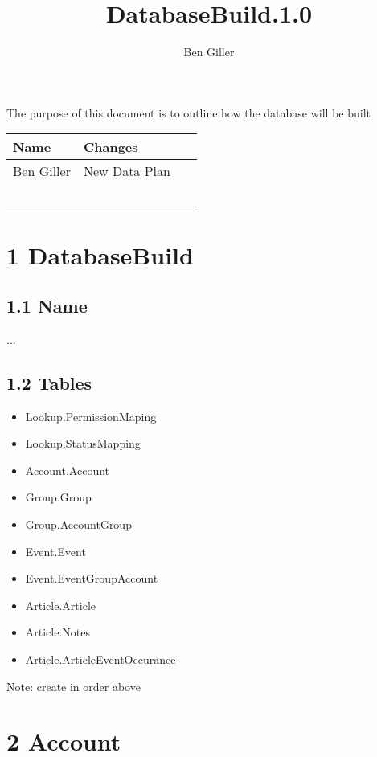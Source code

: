 \documentclass[12pt,fleqn]{article}
\title{DatabaseBuild.1.0}
\author{Ben Giller}
\begin{document}
\maketitle

The purpose of this document is to outline how the database will be built

\begin{table}
\centering
\label{DB changes}
    \begin{tabular}{|l|l|l|}
        \hline
        Name & Changes & ~ \\ \hline
        Ben Giller & New Data Plan & ~ \\ 
        ~ & ~ & ~ \\
        \hline
    \end{tabular}
\end{table}

\newpage

\section* {1 DatabaseBuild}

\subsection*{1.1 Name }
...
\subsection*{1.2 Tables }

\begin{itemize}
\itemsep0em
  \item Lookup.PermissionMaping
  \item Lookup.StatusMapping
  \item Account.Account
  \item Group.Group
  \item Group.AccountGroup
  \item Event.Event
  \item Event.EventGroupAccount
  \item Article.Article
  \item Article.Notes
  \item Article.ArticleEventOccurance
  
\end{itemize}
\par Note: create in order above
\section* {2 Account}
\end{document}
